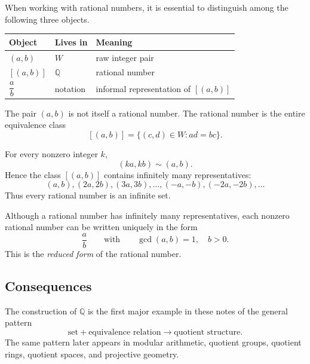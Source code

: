 \begin{remark}
\label{rem:rational-three-levels}

When working with rational numbers, it is essential to distinguish among the following three objects.

\begin{center}
\begin{tabular}{lll}
\toprule
\textbf{Object} & \textbf{Lives in} & \textbf{Meaning} \\
\midrule
$(a,b)$ & $W$ & raw integer pair \\
$[(a,b)]$ & $\mathbb{Q}$ & rational number \\
$\dfrac{a}{b}$ & notation & informal representation of $[(a,b)]$ \\
\bottomrule
\end{tabular}
\end{center}

The pair $(a,b)$ is not itself a rational number.  The rational number is the entire equivalence
class
\[
[(a,b)] = \{(c,d)\in W : ad = bc\}.
\]

\end{remark}

\begin{remark}
\label{rem:rational-infinite-set}

For every nonzero integer $k$,
\[
(ka,kb)\sim(a,b).
\]
Hence the class $[(a,b)]$ contains infinitely many representatives:
\[
(a,b),(2a,2b),(3a,3b),\dots,(-a,-b),(-2a,-2b),\dots
\]
Thus every rational number is an infinite set.
\end{remark}

\begin{remark}
\label{rem:reduced-rational}

Although a rational number has infinitely many representatives, each nonzero rational number can be
written uniquely in the form
\[
\frac{a}{b}
\qquad\text{with}\qquad
\gcd(a,b)=1,
\quad b>0.
\]
This is the \emph{reduced form} of the rational number.

\end{remark}

\subsection{Consequences}

\begin{remark}
\label{rem:quotient-pattern}

The construction of $\mathbb{Q}$ is the first major example in these notes of the general pattern
\[
\text{set} + \text{equivalence relation} \longrightarrow \text{quotient structure}.
\]
The same pattern later appears in modular arithmetic, quotient groups, quotient rings, quotient
spaces, and projective geometry.

\end{remark}
